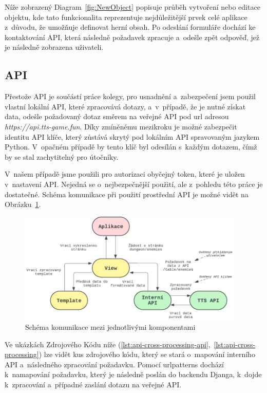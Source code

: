 Níže zobrazený Diagram~\ref{fig:NewObject} popisuje průběh vytvoření nebo editace objektu, kde tato funkcionalita reprezentuje nejdůležitější prvek celé aplikace z~důvodu, že umožňuje definovat herní obsah. Po odeslání formuláře dochází ke kontaktování API, která následně požadavek zpracuje a~odešle zpět odpověď, jež je následně zobrazena uživateli.


\subsection{API}
\label{subsec:implementation-api}
Přestože API je součástí práce kolegy, pro usnadnění a~zabezpečení jsem použil vlastní lokální API, které zpracovává dotazy, a~v~případě, že je nutné získat data, odešle požadovaný dotaz směrem na veřejné API pod url adresou \textit{https://api.tts-game.fun}. Díky zmíněnému mezikroku je možné zabezpečit identitu API klíče, který zůstává skrytý pod lokálním API spravovaným jazykem Python. V~opačném případě by tento klíč byl odesílán s~každým dotazem, čímž by se stal zachytitelný pro útočníky.

V~našem případě jsme použili pro autorizaci obyčejný token, které je uložen v~nastavení API. Nejedná se o~nejbezpečnější použití, ale z~pohledu této práce je dostatečné. Schéma komunikace při použití prostřední API je možné vidět na Obrázku~\ref{fig:api_communication}.

\begin{figure}[H]
    \centering
    \includegraphics[width=0.96\textwidth]{diagrams/API_Communication}
    \caption{Schéma komunikace mezi jednotlivými komponentami}
    \label{fig:api_communication}
\end{figure}

Ve ukázkách Zdrojového Kódu níže (\ref{lst:api-cross-processing-api},~\ref{lst:api-cross-processing}) lze vidět kus zdrojového kódu, který se stará o~mapování interního API a~následného zpracování požadavku. Pomocí urlpatterns dochází k~namapování požadavku, který je následně poslán do backendu Djanga, k~dojde k~zpracování a~případné zaslání dotazu na veřejné API\@.

